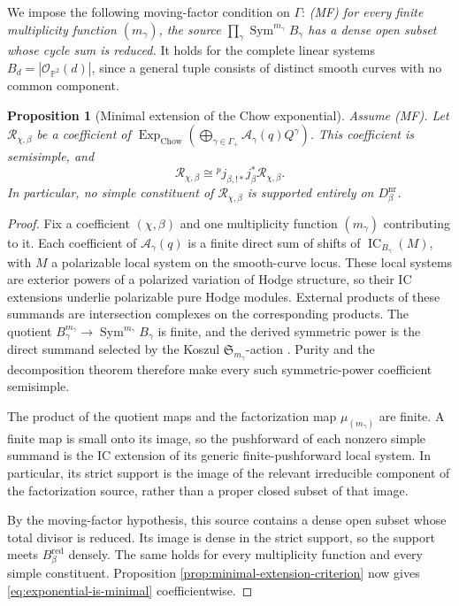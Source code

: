 \documentclass[11pt,reqno]{amsart}
\newtheorem{proposition}[theorem]{Proposition}
\theoremstyle{definition}
\newcommand{\Pp}{\mathbb P}
\newcommand{\Ocal}{\mathcal O}
\newcommand{\IC}{\operatorname{IC}}
\newcommand{\red}{\mathrm{red}}
\newcommand{\nr}{\mathrm{nr}}
\newcommand{\ExpChow}{\operatorname{Exp}_{\mathrm{Chow}}}
\begin{document}
We impose the following moving-factor condition on $\Gamma$:
\emph{(MF) for every finite multiplicity function $(m_\gamma)$, the source
$\prod_\gamma\operatorname{Sym}^{m_\gamma}B_\gamma$ has a dense open subset
whose cycle sum is reduced.}
It holds for the complete linear systems $B_d=|\Ocal_{\Pp^2}(d)|$, since a
general tuple consists of distinct smooth curves with no common component.

\begin{proposition}[Minimal extension of the Chow exponential]
\label{prop:exponential-minimal-extension}
Assume \emph{(MF)}.
Let $\mathcal R_{\chi,\beta}$ be a coefficient of
$\ExpChow(\bigoplus_{\gamma\in\Gamma_+}
\mathcal A_\gamma(q)Q^\gamma)$.  This coefficient is semisimple, and
\begin{equation}\label{eq:exponential-is-minimal}
 \mathcal R_{\chi,\beta}
 \cong{}^pj_{\beta,!*}j_\beta^*\mathcal R_{\chi,\beta}.
\end{equation}
In particular, no simple constituent of $\mathcal R_{\chi,\beta}$ is
supported entirely on $D_\beta^{\nr}$.
\end{proposition}

\begin{proof}
Fix a coefficient $(\chi,\beta)$ and one multiplicity function
$(m_\gamma)$ contributing to it.  Each coefficient of
$\mathcal A_\gamma(q)$ is a finite direct sum of shifts of
$\IC_{B_\gamma}(M)$, with $M$ a polarizable local system on the smooth-curve
locus.  These local systems are exterior powers of a polarized variation of
Hodge structure, so their IC extensions underlie polarizable pure Hodge
modules.  External products of these summands are intersection complexes on
the corresponding products.  The quotient
$B_\gamma^{m_\gamma}\to\operatorname{Sym}^{m_\gamma}B_\gamma$ is finite,
and the derived symmetric power is the direct summand selected by the
Koszul $\mathfrak S_{m_\gamma}$-action
\cite{MaximSaitoSchurmann}.  Purity and the decomposition theorem therefore
make every such symmetric-power coefficient semisimple.

The product of the quotient maps and the factorization map
$\mu_{(m_\gamma)}$ are finite.  A finite map is small onto its image, so the
pushforward of each nonzero simple summand is the IC extension of its
generic finite-pushforward local system.  In particular, its strict support
is the image of the relevant irreducible component of the factorization
source, rather than a proper closed subset of that image.

By the moving-factor hypothesis, this source contains a dense open subset
whose total divisor is reduced.  Its image is dense in the strict support,
so the support meets $B_\beta^{\red}$ densely.  The same holds for every
multiplicity function and every simple constituent.  Proposition
\ref{prop:minimal-extension-criterion} now gives
\eqref{eq:exponential-is-minimal} coefficientwise.
\end{proof}
\end{document}
